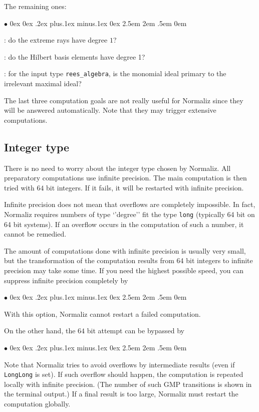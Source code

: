 \documentclass[12pt,a4paper]{scrartcl}
\newcommand{\stdli}{ \topsep0ex \partopsep0ex %
\parsep.2ex plus.1ex minus.1ex \itemsep0ex%
\leftmargin2.5em \labelwidth2em \labelsep.5em \rightmargin0em}%
\renewenvironment{itemize}{\begin{list}{{$\bullet$}}{\stdli}}{\end{list}}
\theoremstyle{definition}
\def\itemtt[#1]{\item[\textbf{\ttt{#1}}]}
\def\ttt{\texttt}
\begin{document}
The remaining ones:

\begin{itemize}
	
	\itemtt[IsDeg1ExtremeRays]: do the extreme rays have degree $1$?
	
	\itemtt[IsDeg1HilbertBasis]: do the Hilbert basis elements have degree 1?
	
	\itemtt[IsReesPrimary]: for the input type \verb|rees_algebra|, is the monomial ideal primary to the irrelevant maximal ideal?
	
\end{itemize}

The last three computation goals are not really useful for Normaliz since they will be answered automatically. Note that they may trigger extensive computations.

\subsection{Integer type}\label{Integer}

There is no need to worry about the integer type chosen by Normaliz. All preparatory computations use infinite precision. The main computation is then tried with $64$ bit integers. If it fails, it will be restarted with infinite precision.

Infinite precision does not mean that overflows are completely impossible. In fact, Normaliz requires numbers of type `'degree'' fit the type \verb|long| (typically 64 bit on 64 bit systems). If an overflow occurs in the computation of such a number, it cannot be remedied.

The amount of computations done with infinite precision is usually very small, but the transformation of the computation results from 64 bit integers to infinite precision may take some time. If you need the highest possible speed, you can suppress infinite precision completely by 
\begin{itemize}
	\itemtt[LongLong]	
\end{itemize}
With this option, Normaliz cannot restart a failed computation.

On the other hand, the $64$ bit attempt can be bypassed by
\begin{itemize}
	\itemtt[BigInt, -B]	
\end{itemize}

Note that Normaliz tries to avoid overflows by intermediate results (even if \verb|LongLong| is set). If such overflow should happen, the computation is repeated locally with infinite precision. (The number of such GMP transitions is shown in the terminal output.) If a final result is too large, Normaliz must restart the computation globally.
\end{document}
